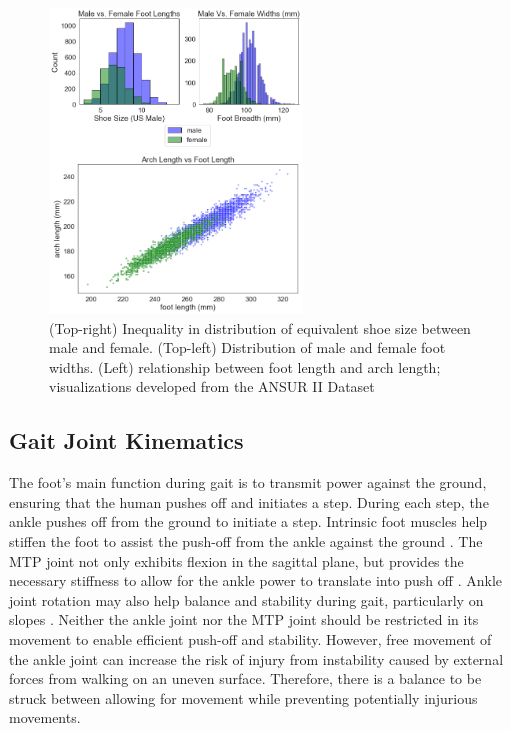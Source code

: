 \documentclass[defaultstyle,11pt]{thesis}
\begin{document}
\hypertarget{fig:SA3-ANSUR}{%
\begin{figure}
\centering
\includegraphics[width=0.6\textwidth,height=\textheight]{../fig/SA3/ANSUR.png}
\caption[{ANSUR II shoe size and foot width by sex distribution. Relationship between foot length and arch length}]{(Top-right) Inequality in distribution of equivalent shoe size between male and female. (Top-left) Distribution of male and female foot widths. (Left) relationship between foot length and arch length; visualizations developed from the ANSUR II Dataset}
\label{fig:SA3-ANSUR}
\end{figure}
}

\hypertarget{gait-joint-kinematics}{%
\subsection{Gait Joint Kinematics}\label{gait-joint-kinematics}}

The foot's main function during gait is to transmit power against the ground, ensuring that the human pushes off and initiates a step.
During each step, the ankle pushes off from the ground to initiate a step.
Intrinsic foot muscles help stiffen the foot to assist the push-off from the ankle against the ground \citep{Farris2019}.
The MTP joint not only exhibits flexion in the sagittal plane, but provides the necessary stiffness to allow for the ankle power to translate into push off \citep{Stefanyshyn1997}.
Ankle joint rotation may also help balance and stability during gait, particularly on slopes \citep{Wannop2014}. Neither the ankle joint nor the MTP joint should be restricted in its movement to enable efficient push-off and stability.
However, free movement of the ankle joint can increase the risk of injury from instability caused by external forces from walking on an uneven surface.
Therefore, there is a balance to be struck between allowing for movement while preventing potentially injurious movements.
\end{document}
